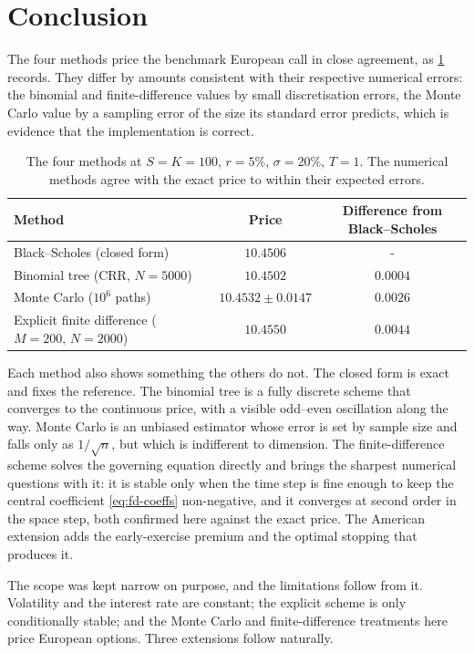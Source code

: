 \documentclass[11pt,a4paper]{article}
\numberwithin{equation}{section}
\theoremstyle{definition}
\theoremstyle{plain}
\theoremstyle{remark}
\begin{document}
\section{Conclusion}\label{sec:conclusion}

The four methods price the benchmark European call in close agreement, as
\cref{tab:crossval} records. They differ by amounts consistent with their
respective numerical errors: the binomial and finite-difference values by small
discretisation errors, the Monte Carlo value by a sampling error of the size its
standard error predicts, which is evidence that the implementation is
correct.

\begin{table}[H]
  \centering
  \small
  \begin{tabular}{lcc}
    \toprule
    Method & Price & Difference from Black--Scholes \\
    \midrule
    Black--Scholes (closed form) & $10.4506$ & - \\
    Binomial tree (CRR, $N = 5000$) & $10.4502$ & $0.0004$ \\
    Monte Carlo ($10^{6}$ paths) & $10.4532 \pm 0.0147$ & $0.0026$ \\
    Explicit finite difference ($M = 200,\,N = 2000$) & $10.4550$ & $0.0044$ \\
    \bottomrule
  \end{tabular}
  \caption{The four methods at $S = K = 100$, $r = 5\%$, $\sigma = 20\%$,
    $T = 1$. The numerical methods agree with the exact price to within their
    expected errors.}
  \label{tab:crossval}
\end{table}

Each method also shows something the others do not. The closed form is exact and
fixes the reference. The binomial tree is a fully discrete scheme that converges
to the continuous price, with a visible odd--even oscillation along the way. Monte
Carlo is an unbiased estimator whose error is set by sample size and falls only as
$1/\sqrt{n}$, but which is indifferent to dimension. The finite-difference scheme
solves the governing equation directly and brings the sharpest numerical
questions with it: it is stable only when the time step is fine enough to keep the
central coefficient \eqref{eq:fd-coeffs} non-negative, and it converges at second
order in the space step, both confirmed here against the exact price. The American
extension adds the early-exercise premium and the optimal stopping that produces
it.

The scope was kept narrow on purpose, and the limitations follow from it.
Volatility and the interest rate are constant; the explicit scheme is only
conditionally stable; and the Monte Carlo and finite-difference treatments here
price European options. Three extensions follow naturally.
\end{document}
